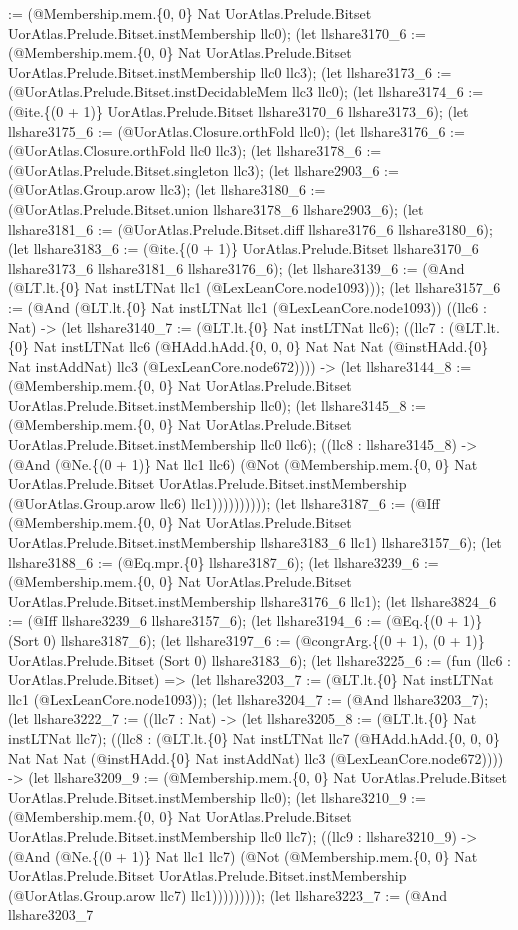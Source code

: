 \documentclass[11pt]{article}
\begin{document}
:= (@Membership.mem.\{0, 0\} Nat UorAtlas.Prelude.Bitset UorAtlas.Prelude.Bitset.instMembership llc0); (let llshare3170\_6 := (@Membership.mem.\{0, 0\} Nat UorAtlas.Prelude.Bitset UorAtlas.Prelude.Bitset.instMembership llc0 llc3); (let llshare3173\_6 := (@UorAtlas.Prelude.Bitset.instDecidableMem llc3 llc0); (let llshare3174\_6 := (@ite.\{(0 + 1)\} UorAtlas.Prelude.Bitset llshare3170\_6 llshare3173\_6); (let llshare3175\_6 := (@UorAtlas.Closure.orthFold llc0); (let llshare3176\_6 := (@UorAtlas.Closure.orthFold llc0 llc3); (let llshare3178\_6 := (@UorAtlas.Prelude.Bitset.singleton llc3); (let llshare2903\_6 := (@UorAtlas.Group.arow llc3); (let llshare3180\_6 := (@UorAtlas.Prelude.Bitset.union llshare3178\_6 llshare2903\_6); (let llshare3181\_6 := (@UorAtlas.Prelude.Bitset.diff llshare3176\_6 llshare3180\_6); (let llshare3183\_6 := (@ite.\{(0 + 1)\} UorAtlas.Prelude.Bitset llshare3170\_6 llshare3173\_6 llshare3181\_6 llshare3176\_6); (let llshare3139\_6 := (@And (@LT.lt.\{0\} Nat instLTNat llc1 (@LexLeanCore.node1093))); (let llshare3157\_6 := (@And (@LT.lt.\{0\} Nat instLTNat llc1 (@LexLeanCore.node1093)) ((llc6 : Nat) -> (let llshare3140\_7 := (@LT.lt.\{0\} Nat instLTNat llc6); ((llc7 : (@LT.lt.\{0\} Nat instLTNat llc6 (@HAdd.hAdd.\{0, 0, 0\} Nat Nat Nat (@instHAdd.\{0\} Nat instAddNat) llc3 (@LexLeanCore.node672)))) -> (let llshare3144\_8 := (@Membership.mem.\{0, 0\} Nat UorAtlas.Prelude.Bitset UorAtlas.Prelude.Bitset.instMembership llc0); (let llshare3145\_8 := (@Membership.mem.\{0, 0\} Nat UorAtlas.Prelude.Bitset UorAtlas.Prelude.Bitset.instMembership llc0 llc6); ((llc8 : llshare3145\_8) -> (@And (@Ne.\{(0 + 1)\} Nat llc1 llc6) (@Not (@Membership.mem.\{0, 0\} Nat UorAtlas.Prelude.Bitset UorAtlas.Prelude.Bitset.instMembership (@UorAtlas.Group.arow llc6) llc1)))))))))); (let llshare3187\_6 := (@Iff (@Membership.mem.\{0, 0\} Nat UorAtlas.Prelude.Bitset UorAtlas.Prelude.Bitset.instMembership llshare3183\_6 llc1) llshare3157\_6); (let llshare3188\_6 := (@Eq.mpr.\{0\} llshare3187\_6); (let llshare3239\_6 := (@Membership.mem.\{0, 0\} Nat UorAtlas.Prelude.Bitset UorAtlas.Prelude.Bitset.instMembership llshare3176\_6 llc1); (let llshare3824\_6 := (@Iff llshare3239\_6 llshare3157\_6); (let llshare3194\_6 := (@Eq.\{(0 + 1)\} (Sort 0) llshare3187\_6); (let llshare3197\_6 := (@congrArg.\{(0 + 1), (0 + 1)\} UorAtlas.Prelude.Bitset (Sort 0) llshare3183\_6); (let llshare3225\_6 := (fun (llc6 : UorAtlas.Prelude.Bitset) => (let llshare3203\_7 := (@LT.lt.\{0\} Nat instLTNat llc1 (@LexLeanCore.node1093)); (let llshare3204\_7 := (@And llshare3203\_7); (let llshare3222\_7 := ((llc7 : Nat) -> (let llshare3205\_8 := (@LT.lt.\{0\} Nat instLTNat llc7); ((llc8 : (@LT.lt.\{0\} Nat instLTNat llc7 (@HAdd.hAdd.\{0, 0, 0\} Nat Nat Nat (@instHAdd.\{0\} Nat instAddNat) llc3 (@LexLeanCore.node672)))) -> (let llshare3209\_9 := (@Membership.mem.\{0, 0\} Nat UorAtlas.Prelude.Bitset UorAtlas.Prelude.Bitset.instMembership llc0); (let llshare3210\_9 := (@Membership.mem.\{0, 0\} Nat UorAtlas.Prelude.Bitset UorAtlas.Prelude.Bitset.instMembership llc0 llc7); ((llc9 : llshare3210\_9) -> (@And (@Ne.\{(0 + 1)\} Nat llc1 llc7) (@Not (@Membership.mem.\{0, 0\} Nat UorAtlas.Prelude.Bitset UorAtlas.Prelude.Bitset.instMembership (@UorAtlas.Group.arow llc7) llc1))))))))); (let llshare3223\_7 := (@And llshare3203\_7 
\end{document}
